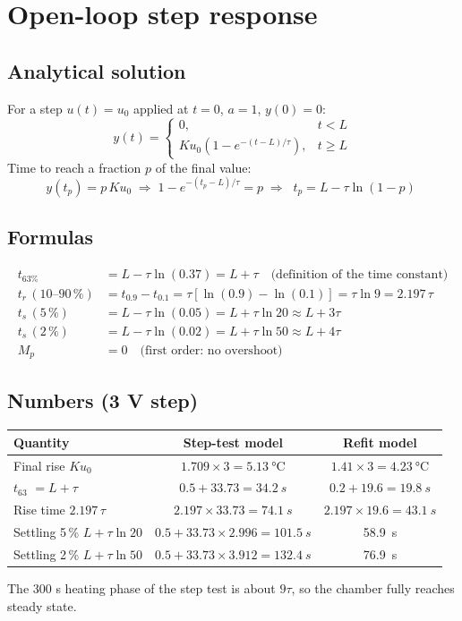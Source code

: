 \documentclass[11pt,a4paper]{article}
\begin{document}
\section{Open-loop step response}

\subsection{Analytical solution}
For a step $u(t) = u_0$ applied at $t=0$, $a=1$, $y(0)=0$:
\[
\boxed{\;y(t) = \begin{cases} 0, & t < L\\[2pt] K u_0\left(1 - e^{-(t-L)/\tau}\right), & t \ge L\end{cases}\;}
\]
Time to reach a fraction $p$ of the final value:
\[
y(t_p) = p\,K u_0 \;\Rightarrow\; 1 - e^{-(t_p - L)/\tau} = p \;\Rightarrow\;
\boxed{\;t_p = L - \tau\ln(1-p)\;}
\]

\subsection{Formulas}
\begin{align*}
t_{63\%} &= L - \tau\ln(0.37) = L + \tau \quad\text{(definition of the time constant)}\\
t_r\,(10\text{--}90\,\%) &= t_{0.9} - t_{0.1} = \tau\left[\ln(0.9) - \ln(0.1)\right] = \tau\ln 9 = 2.197\,\tau\\
t_s\,(5\,\%) &= L - \tau\ln(0.05) = L + \tau\ln 20 \approx L + 3\tau\\
t_s\,(2\,\%) &= L - \tau\ln(0.02) = L + \tau\ln 50 \approx L + 4\tau\\
M_p &= 0 \quad\text{(first order: no overshoot)}
\end{align*}

\subsection{Numbers (3 V step)}
\begin{center}
\begin{tabular}{@{}lcc@{}}
\toprule
Quantity & Step-test model & Refit model\\
\midrule
Final rise $K u_0$ & $1.709\times3 = \SI{5.13}{\celsius}$ & $1.41\times3 = \SI{4.23}{\celsius}$\\
$t_{63}$ $= L + \tau$ & $0.5 + 33.73 = \SI{34.2}{s}$ & $0.2 + 19.6 = \SI{19.8}{s}$\\
Rise time $2.197\,\tau$ & $2.197\times33.73 = \SI{74.1}{s}$ & $2.197\times19.6 = \SI{43.1}{s}$\\
Settling 5\,\% $L + \tau\ln20$ & $0.5 + 33.73\times2.996 = \SI{101.5}{s}$ & \SI{58.9}{s}\\
Settling 2\,\% $L + \tau\ln50$ & $0.5 + 33.73\times3.912 = \SI{132.4}{s}$ & \SI{76.9}{s}\\
\bottomrule
\end{tabular}
\end{center}
The 300 s heating phase of the step test is about $9\tau$, so the chamber fully reaches steady state.
\end{document}

